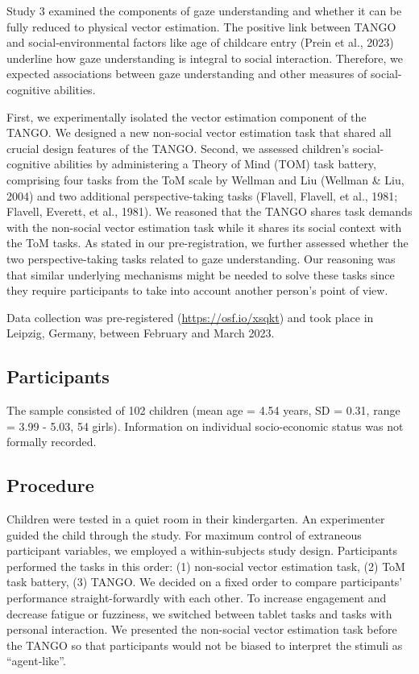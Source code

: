 \documentclass[
  man,mask,floatsintext]{apa7}
\begin{document}
Study 3 examined the components of gaze understanding and whether it can be fully reduced to physical vector estimation. The positive link between TANGO and social-environmental factors like age of childcare entry (Prein et al., 2023) underline how gaze understanding is integral to social interaction. Therefore, we expected associations between gaze understanding and other measures of social-cognitive abilities.

First, we experimentally isolated the vector estimation component of the TANGO. We designed a new non-social vector estimation task that shared all crucial design features of the TANGO. Second, we assessed children's social-cognitive abilities by administering a Theory of Mind (TOM) task battery, comprising four tasks from the ToM scale by Wellman and Liu (Wellman \& Liu, 2004) and two additional perspective-taking tasks (Flavell, Flavell, et al., 1981; Flavell, Everett, et al., 1981). We reasoned that the TANGO shares task demands with the non-social vector estimation task while it shares its social context with the ToM tasks. As stated in our pre-registration, we further assessed whether the two perspective-taking tasks related to gaze understanding. Our reasoning was that similar underlying mechanisms might be needed to solve these tasks since they require participants to take into account another person's point of view.

Data collection was pre-registered (\url{https://osf.io/xsqkt}) and took place in Leipzig, Germany, between February and March 2023.

\hypertarget{participants-2}{%
\subsection{Participants}\label{participants-2}}

The sample consisted of 102 children (mean age = 4.54 years, SD = 0.31, range = 3.99 - 5.03, 54 girls). Information on individual socio-economic status was not formally recorded.

\hypertarget{procedure-2}{%
\subsection{Procedure}\label{procedure-2}}

Children were tested in a quiet room in their kindergarten. An experimenter guided the child through the study. For maximum control of extraneous participant variables, we employed a within-subjects study design. Participants performed the tasks in this order: (1) non-social vector estimation task, (2) ToM task battery, (3) TANGO. We decided on a fixed order to compare participants' performance straight-forwardly with each other. To increase engagement and decrease fatigue or fuzziness, we switched between tablet tasks and tasks with personal interaction. We presented the non-social vector estimation task before the TANGO so that participants would not be biased to interpret the stimuli as ``agent-like''.
\end{document}
